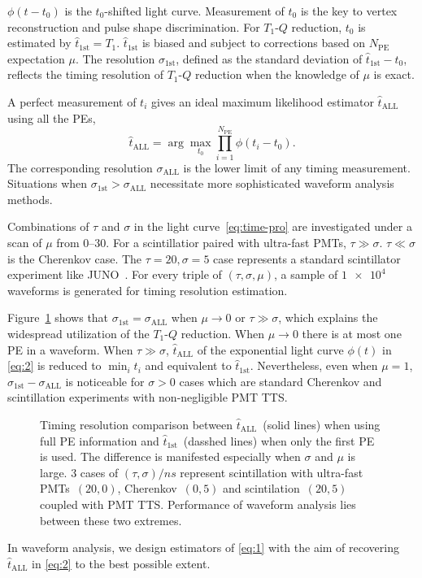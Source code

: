 $\phi(t-t_0)$ is the $t_0$-shifted light curve. Measurement of $t_0$ is the key to vertex reconstruction and pulse shape discrimination.  For $T_1$-$Q$ reduction, $t_0$ is estimated by $\hat{t}_\mathrm{1st} = T_1$. $\hat{t}_\mathrm{1st}$ is biased and subject to corrections based on $N_\mathrm{PE}$ expectation $\mu$. The resolution $\sigma_\mathrm{1st}$, defined as the standard deviation of $\hat{t}_\mathrm{1st} - t_0$, reflects the timing resolution of $T_1$-$Q$ reduction when the knowledge of $\mu$ is exact.

A perfect measurement of $t_i$ gives an ideal maximum likelihood estimator $\hat{t}_\mathrm{ALL}$ using all the PEs,
\begin{equation}
  \label{eq:2}
  \hat{t}_\mathrm{ALL} = \arg\underset{t_0}{\max} \prod_{i=1}^{N_\mathrm{PE}} \phi(t_i-t_0).
\end{equation}
The corresponding resolution $\sigma_\mathrm{ALL}$ is the lower limit of any timing measurement.  Situations when $\sigma_\mathrm{1st} > \sigma_\mathrm{ALL}$ necessitate more sophisticated waveform analysis methods.

Combinations of $\tau$ and $\sigma$ in the light curve~\eqref{eq:time-pro} are investigated under a scan of $\mu$ from \numrange{0}{30}. For a scintillatior paired with ultra-fast PMTs, $\tau \gg \sigma$.  $\tau \ll \sigma$ is the Cherenkov case.  The $\tau=20, \sigma=5$ case represents a standard scintillator experiment like JUNO~\cite{ludhova_particle_2020}.  For every triple of $(\tau, \sigma, \mu)$, a sample of $\num[retain-unity-mantissa=false]{1e4}$ waveforms is generated for timing resolution estimation.

Figure~\ref{fig:reso-diff} shows that $\sigma_{\mathrm{1st}}=\sigma_{\mathrm{ALL}}$ when $\mu \to 0$ or $\tau \gg \sigma$, which explains the widespread utilization of the $T_1$-$Q$ reduction.  When $\mu \to 0$ there is at most one PE in a waveform.  When $\tau \gg \sigma$, $\hat{t}_\mathrm{ALL}$ of the exponential light curve $\phi(t)$ in \eqref{eq:2} is reduced to $\min_i t_i$ and equivalent to $\hat{t}_\mathrm{1st}$.  Nevertheless, even when $\mu = 1$, $\sigma_{\mathrm{1st}} - \sigma_{\mathrm{ALL}}$ is noticeable for $\sigma > 0$ cases which are standard Cherenkov and scintillation experiments with non-negligible PMT TTS.
\begin{figure}[H]
  \centering
  \scalebox{0.63}{}
  \caption{\label{fig:reso-diff} Timing resolution comparison between $\hat{t}_{\mathrm{ALL}}$~(solid lines) when using full PE information and $\hat{t}_\mathrm{1st}$~(dasshed lines) when only the first PE is used.  The difference is manifested especially when $\sigma$ and $\mu$ is large.  3 cases of $(\tau, \sigma)/\si{ns}$ represent scintillation with ultra-fast PMTs~$(20,0)$, Cherenkov~$(0, 5)$ and scintilation~$(20, 5)$ coupled with PMT TTS. Performance of waveform analysis lies between these two extremes.}
\end{figure}

In waveform analysis, we design estimators of \eqref{eq:1} with the aim of recovering $\hat{t}_\mathrm{ALL}$ in \eqref{eq:2} to the best possible extent.
